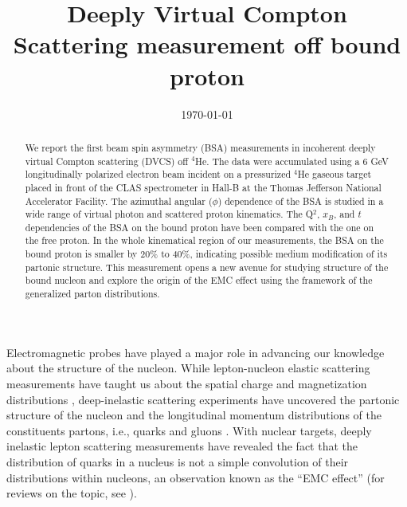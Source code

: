 \documentclass[twocolumn,nofootinbib,showpacs,prl,superscriptaddress,secnumarabic,amssymb,nobibnotes,aps,floatfix]{revtex4}
\begin{document}
\linenumbers

\title{Deeply Virtual Compton Scattering measurement off bound proton}



\date{\today}
\begin{abstract}
 We report the first beam spin asymmetry (BSA) measurements in incoherent 
   deeply virtual Compton scattering (DVCS) off $^4$He. The data were 
   accumulated using a 6 GeV longitudinally 
   polarized electron beam incident on a pressurized $^4$He gaseous target 
   placed in front of the CLAS spectrometer in Hall-B at the Thomas Jefferson 
   National Accelerator Facility. The azimuthal angular ($\phi$) dependence of 
   the BSA is studied in a wide range of virtual photon and scattered proton 
   kinematics. The Q$^2$, $x_B$, and $t$ dependencies of the BSA on the bound 
   proton have been compared with the one on the free proton. In the whole 
   kinematical region of our measurements, the BSA on the bound proton is 
   smaller by $20\%$ to $40\%$, indicating possible medium modification 
   of its partonic structure. This measurement opens a new avenue for 
   studying structure of the bound nucleon and explore the origin of the EMC 
   effect using the framework of the generalized parton distributions.

\end{abstract}

\maketitle 

Electromagnetic probes have played a major role in advancing our knowledge 
about the structure of the nucleon. While lepton-nucleon elastic scattering 
measurements have 
taught us about the spatial charge and magnetization distributions 
\cite{Hofstadter:1955ae,Perdrisat:2006hj}, deep-inelastic scattering 
experiments have uncovered the partonic structure of the nucleon and 
the longitudinal momentum distributions of the 
constituents partons, i.e., quarks and gluons \cite{pdg}.  
With nuclear targets, deeply inelastic lepton scattering measurements 
have revealed the fact that the 
distribution of quarks in a nucleus is not a simple convolution of 
their distributions within nucleons, an observation known as the ``EMC 
effect''\cite{EMC_first} (for reviews on the topic, see  
\cite{Arneodo:1992wf,Geesaman:1995yd,Norton:2003cb,Hen:2016kwk}).
\end{document}
